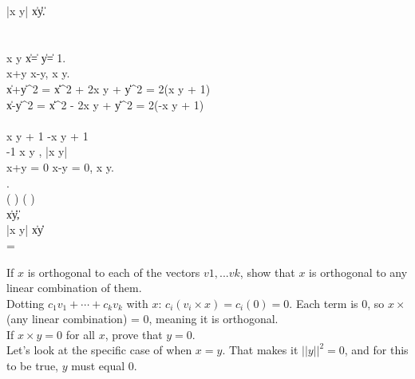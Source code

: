 \documentclass[12pt]{article}
\begin{document}
 |x \times y| \leq \|x\|\|y\|. \\
 \\
 \\
 x  y  \|x\| = \|y\| = 1. \\
 x+y  x-y,  x  y. \\
\|x+y\|^2 = \|x\|^2 + 2x \times y + \|y\|^2 = 2(x \times y + 1) \\
\|x-y\|^2 = \|x\|^2 - 2x \times y + \|y\|^2 = 2(-x \times y + 1) \\
 \\
 x \times y + 1   -x \times y + 1  \\
-1 \leq x \times y ,  |x \times y|  \\
 x+y = 0  x-y = 0,  x  \pm y. \\
   . \\
 \left(  \right) \times \left(  \right)   \\
 \|x\|\|y\|,  \\
|x \times y| \leq \|x\|\|y\| \\
  = \pm {}



If $x$ is orthogonal to each of the vectors $v1,...vk$, show that $x$ is orthogonal to any linear combination of them.\\
Dotting $c_1v_1+\cdots+c_kv_k$ with $x$: $c_i(v_i \times x) = c_i(0) = 0$. Each term is 0, so $x \times$(any linear combination) = 0, meaning it is orthogonal.\\

If $x\times y=0$ for all $x$, prove that $y=0$.\\
Let's look at the specific case of when $x=y$.
That makes it $||y||^2 = 0$, and for this to be true, $y$ must equal $0$.\\
\end{document}

